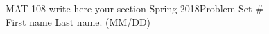 \documentclass[12pt]{article}
\begin{document}
	\noindent MAT 108 write here your section Spring 2018\hfill Problem Set \#\\
	First name Last name. (MM/DD)
	
	\hrulefill
	
	

	
	
\end{document}
